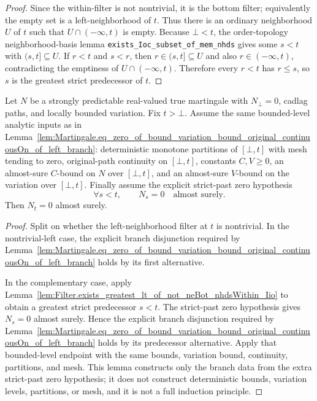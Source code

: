 \begin{proof}
Since the within-filter is not nontrivial, it is the bottom filter; equivalently
the empty set is a left-neighborhood of \(t\).  Thus there is an ordinary
neighborhood \(U\) of \(t\) such that \(U\cap(-\infty,t)\) is empty.  Because
\(\bot<t\), the order-topology neighborhood-basis lemma
\texttt{exists\_Ioc\_subset\_of\_mem\_nhds} gives some \(s<t\) with
\((s,t]\subseteq U\).  If \(r<t\) and \(s<r\), then \(r\in(s,t]\subseteq U\)
and also \(r\in(-\infty,t)\), contradicting the emptiness of
\(U\cap(-\infty,t)\).  Therefore every \(r<t\) has \(r\le s\), so \(s\) is the
greatest strict predecessor of \(t\).
\end{proof}

\begin{lemma}\label{lem:Martingale.eq_zero_of_bound_variation_bound_original_continuousOn_of_strictPast_zero}
Let \(N\) be a strongly predictable real-valued true martingale with
\(N_\bot=0\), cadlag paths, and locally bounded variation.  Fix \(t>\bot\).
Assume the same bounded-level analytic inputs as in
Lemma~\ref{lem:Martingale.eq_zero_of_bound_variation_bound_original_continuousOn_of_left_branch}:
deterministic monotone partitions of \([\bot,t]\) with mesh tending to zero,
original-path continuity on \([\bot,t]\), constants \(C,V\ge0\), an
almost-sure \(C\)-bound on \(N\) over \([\bot,t]\), and an almost-sure
\(V\)-bound on the variation over \([\bot,t]\).  Finally assume the explicit
strict-past zero hypothesis
\[
  \forall s<t,\qquad N_s=0\quad\text{almost surely}.
\]
Then \(N_t=0\) almost surely.
\end{lemma}

\begin{proof}
Split on whether the left-neighborhood filter at \(t\) is nontrivial.  In the
nontrivial-left case, the explicit branch disjunction required by
Lemma~\ref{lem:Martingale.eq_zero_of_bound_variation_bound_original_continuousOn_of_left_branch}
holds by its first alternative.

In the complementary case, apply
Lemma~\ref{lem:Filter.exists_greatest_lt_of_not_neBot_nhdsWithin_Iio} to obtain
a greatest strict predecessor \(s<t\).  The strict-past zero hypothesis gives
\(N_s=0\) almost surely.  Hence the explicit branch disjunction required by
Lemma~\ref{lem:Martingale.eq_zero_of_bound_variation_bound_original_continuousOn_of_left_branch}
holds by its predecessor alternative.  Apply that bounded-level endpoint with
the same bounds, variation bound, continuity, partitions, and mesh.  This
lemma constructs only the branch data from the extra strict-past zero
hypothesis; it does not construct deterministic bounds, variation levels,
partitions, or mesh, and it is not a full induction principle.
\end{proof}

